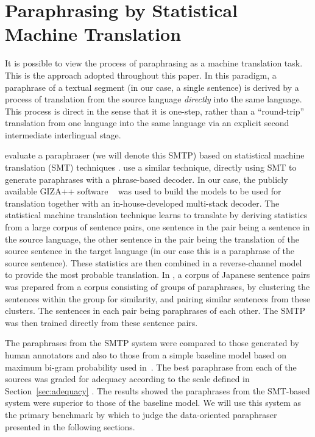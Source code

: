 \section{Paraphrasing by Statistical Machine Translation}
\label{sec:smt}

It is possible to view the process of paraphrasing as a machine translation task.
This is the approach adopted throughout this paper. In this paradigm, a paraphrase of a textual segment
(in our case, a single sentence) is derived by a process of translation from the source language
{\em directly} into the same language. This process is direct in the sense that it is one-step, rather
than a ``round-trip'' translation from one language into the same language via an explicit second intermediate
interlingual stage.

\cite{finch:fit2002} evaluate a paraphraser (we will denote this SMTP) based on statistical machine translation 
(SMT) techniques \cite{Brown:93}. \cite{Quirk:04} use a similar technique, directly using SMT to generate
paraphrases with a phrase-based decoder. In our case, the publicly available GIZA++ software ~\cite{al-onaizan:99} was used
to build the models to be used for translation together with an in-house-developed multi-stack decoder. The
statistical machine translation technique learns to translate by  deriving statistics from a large corpus of
sentence pairs, one sentence in the pair being a sentence in the source language, the other sentence in the pair
being the translation of the source sentence in the target language (in our case this is a paraphrase of the
source sentence).  These statistics are then combined in a  reverse-channel model to provide the most probable
translation. In \cite{finch:fit2002}, a corpus of Japanese sentence pairs was prepared from a corpus consisting
of groups of paraphrases, by clustering the sentences within the group for similarity, and pairing similar
sentences from these clusters. The sentences in each pair being paraphrases of each other. The SMTP was then
trained directly from these sentence pairs.

The paraphrases from the SMTP system were compared to those generated by human annotators and also to those from
a simple baseline model based on maximum bi-gram probability used in~\cite{Knight:00}. The best paraphrase from
each of the sources was graded for adequacy according to the  scale defined in Section~\ref{sec:adequacy}
\cite{Doyon:98}. The results showed the paraphrases from the SMT-based system were superior to those of the
baseline model. We will use this system as the primary benchmark by which to judge the data-oriented paraphraser 
presented in the following sections.

